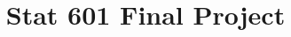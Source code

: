\documentclass[conference,letterpaper]{IEEEtran}
\begin{document}
%
\title{Stat 601 Final Project }




% 
\author{
}







\maketitle
\end{document}

